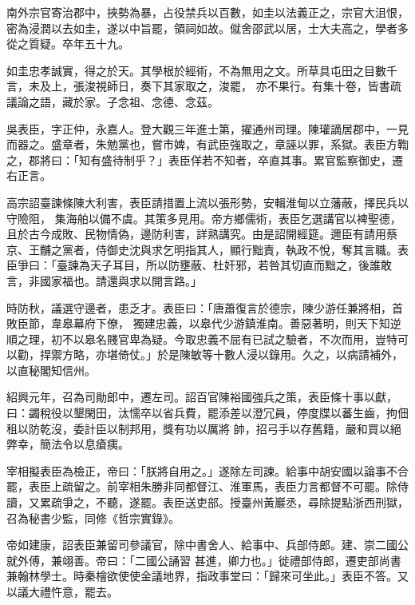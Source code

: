 \begin{pinyinscope}
 南外宗官寄治郡中，挾勢為暴，占役禁兵以百數，如圭以法義正之，宗官大沮恨，密為浸潤以去如圭，遂以中旨罷，領祠如故。僦舍邵武以居，士大夫高之，學者多從之質疑。卒年五十九。



 如圭忠孝誠實，得之於天。其學根於經術，不為無用之文。所草具屯田之目數千言，未及上，張浚視師日，奏下其家取之，浚罷，
 亦不果行。有集十卷，皆書疏議論之語，藏於家。子念祖、念德、念茲。



 吳表臣，字正仲，永嘉人。登大觀三年進士第，擢通州司理。陳瓘謫居郡中，一見而器之。盛章者，朱勉黨也，嘗市婢，有武臣強取之，章誣以罪，系獄。表臣方鞫之，郡將曰：「知有盛待制乎？」表臣佯若不知者，卒直其事。累官監察御史，遷右正言。



 高宗詔臺諫條陳大利害，表臣請措置上流以張形勢，安輯淮甸以立藩蔽，擇民兵以守險阻，
 集海舶以備不虞。其策多見用。帝方鄉儒術，表臣乞選講官以裨聖德，且於古今成敗、民物情偽，邊防利害，詳熟講究。由是詔開經筵。邇臣有請用蔡京、王黼之黨者，侍御史沈與求乞明指其人，顯行黜責，執政不悅，奪其言職。表臣爭曰：「臺諫為天子耳目，所以防壅蔽、杜奸邪，若咎其切直而黜之，後誰敢言，非國家福也。請還與求以開言路。」



 時防秋，議選守邊者，患乏才。表臣曰：「唐蕭復言於德宗，陳少游任兼將相，首敗臣節，韋皋幕府下僚，
 獨建忠義，以皋代少游鎮淮南。善惡著明，則天下知逆順之理，初不以皋名賤官卑為疑。今取忠義不屈有已試之驗者，不次而用，豈特可以勸，捍禦方略，亦堪倚仗。」於是陳敏等十數人浸以錄用。久之，以病請補外，以直秘閣知信州。



 紹興元年，召為司勛郎中，遷左司。詔百官陳裕國強兵之策，表臣條十事以獻，曰：蠲稅役以墾閑田，汰懦卒以省兵費，罷添差以澄冗員，停度牒以蕃生齒，拘佃租以防乾沒，委計臣以制邦用，獎有功以厲將
 帥，招弓手以存舊籍，嚴和買以絕弊幸，簡法令以息瘡痍。



 宰相擬表臣為檢正，帝曰：「朕將自用之。」遂除左司諫。給事中胡安國以論事不合罷，表臣上疏留之。前宰相朱勝非同都督江、淮軍馬，表臣力言都督不可罷。除侍讀，又累疏爭之，不聽，遂罷。表臣送吏部。授臺州黃巖丞，尋除提點浙西刑獄，召為秘書少監，同修《哲宗實錄》。



 帝如建康，詔表臣兼留司參議官，除中書舍人、給事中、兵部侍郎。建、崇二國公就外傅，兼翊善。帝曰：「二國公誦習
 甚進，卿力也。」徙禮部侍郎，遷吏部尚書兼翰林學士。時秦檜欲使使金議地界，指政事堂曰：「歸來可坐此。」表臣不答。又以議大禮忤意，罷去。




\end{pinyinscope}
